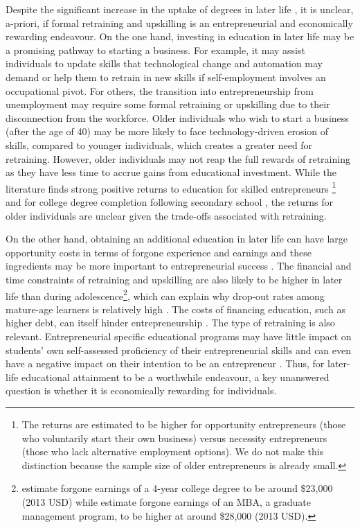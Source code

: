 \documentclass[12pt, a4paper]{article}
\begin{document}
Despite the significant increase in the uptake of degrees in later life \citep{oecd2016}, it is unclear, a-priori, if formal retraining and upskilling is an entrepreneurial and economically rewarding endeavour. On the one hand, investing in education in later life may be a promising pathway to starting a business. For example, it may assist individuals to update skills that technological change and automation may demand \citep{autor2008, acemoglu2011} or help them to retrain in new skills if self-employment involves an occupational pivot. For others, the transition into entrepreneurship from unemployment may require some formal retraining or upskilling due to their disconnection from the workforce. Older individuals who wish to start a business (after the age of 40) may be more likely to face technology-driven erosion of skills, compared to younger individuals, which creates a greater need for retraining. However, older individuals may not reap the full rewards of retraining as they have less time to accrue gains from educational investment. While the literature finds strong positive returns to education for skilled entrepreneurs \citep{fossen2013}\footnote{The returns are estimated to be higher for opportunity entrepreneurs (those who voluntarily start their own business) versus necessity entrepreneurs (those who lack alternative employment options). We do not make this distinction because the sample size of older entrepreneurs is already small.} and for college degree completion following secondary school \citep{jacobson2005, chesters2015, zeidenberg2015, polidano2016, xu2016, belfield2017, dynarski2016, dynarski2018, mountjoy2022}, the returns for older individuals are unclear given the trade-offs associated with retraining. 

On the other hand, obtaining an additional education in later life can have large opportunity costs in terms of forgone experience and earnings \citep{haber2007, montgomery2006} and these ingredients may be more important to entrepreneurial success \citep{zhao2021, weber2004}. The financial and time constraints of retraining and upskilling are also likely to be higher in later life than during adolescence\footnote{\cite{abel2014} estimate forgone earnings of a 4-year college degree to be around \$23,000 (2013 USD) while \cite{montgomery2006} estimate forgone earnings of an MBA, a graduate management program, to be higher at around \$28,000 (2013 USD).}, which can explain why drop-out rates among mature-age learners is relatively high \citep{cherastidtham2018, hanson2022, guerra2022}. The costs of financing education, such as higher debt, can itself hinder entrepreneurship \citep{krishnan2019}. The type of retraining is also relevant. Entrepreneurial specific educational programs may have little impact on students' own self-assessed proficiency of their entrepreneurial skills and can even have a negative impact on their intention to be an entrepreneur \citep{oosterbeek2010}. Thus, for later-life educational attainment to be a worthwhile endeavour, a key unanswered question is whether it is economically rewarding for individuals. 
\end{document}
